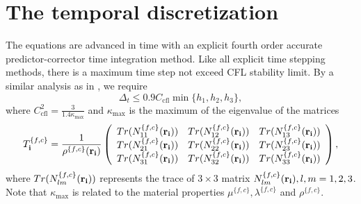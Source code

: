 \section{The temporal discretization}
The equations are advanced in time with an explicit fourth order accurate predictor-corrector time integration method. Like all explicit time stepping methods, there is a maximum time step not exceed CFL stability limit. By a similar analysis as in \cite{sjogreen2012fourth}, we require 
\begin{equation*}
\Delta_t\leq 0.9C_{\text{cfl}}\min\{h_1,h_2,h_3\},
\end{equation*}
where $C_{\text{cfl}}^2 = \frac{3}{1.4\kappa_{\text{max}}}$ and
$\kappa_{\text{max}}$ is the maximum of the eigenvalue of the matrices 
\[T_{\bf i}^{\{f,c\}} = \frac{1}{\rho^{\{f,c\}}({\bf r}_{\bf i})}\left(\begin{array}{ccc}
Tr(N_{11}^{\{f,c\}}({\bf r}_{\bf i})) &  Tr(N_{12}^{\{f,c\}}({\bf r}_{\bf i}))& Tr(N_{13}^{\{f,c\}}({\bf r}_{\bf i}))\\
Tr(N_{21}^{\{f,c\}}({\bf r}_{\bf i})) & Tr(N_{22}^{\{f,c\}}({\bf r}_{\bf i})) & Tr(N_{23}^{\{f,c\}}({\bf r}_{\bf i}))\\
Tr(N_{31}^{\{f,c\}}({\bf r}_{\bf i})) & Tr(N_{32}^{\{f,c\}}({\bf r}_{\bf i})) & Tr(N_{33}^{\{f,c\}}({\bf r}_{\bf i}))\end{array}\right), \]
where $Tr(N_{lm}^{\{f,c\}}({\bf r}_{\bf i}))$ represents the trace of $3\times3$ matrix $N_{lm}^{\{f,c\}}({\bf r}_{\bf i}),l,m = 1,2,3$. Note that $\kappa_{\text{max}}$ is related to the material properties $\mu^{\{f,c\}}, \lambda^{\{f,c\}}$ and $\rho^{\{f,c\}}$.
